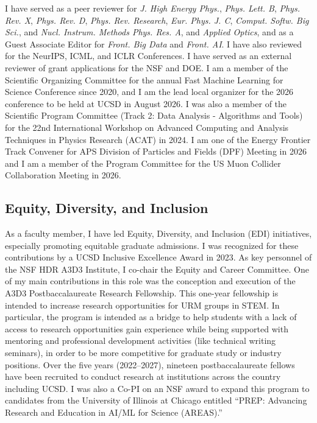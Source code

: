 \documentclass[11pt,letterpaper,notitlepage]{article}
\begin{document}
I have served as a peer reviewer for \emph{J. High Energy Phys.}, \emph{Phys. Lett. B}, \emph{Phys. Rev. X}, \emph{Phys. Rev. D}, \emph{Phys. Rev. Research}, \emph{Eur. Phys. J. C}, \emph{Comput. Softw. Big Sci.}, and \emph{Nucl. Instrum. Methods Phys. Res. A}, and \emph{Applied Optics}, and as a Guest Associate Editor for \emph{Front. Big Data} and \emph{Front. AI}.
I have also reviewed for the NeurIPS, ICML, and ICLR Conferences.
I have served as an external reviewer of grant applications for the NSF and DOE.
I am a member of the Scientific Organizing Committee for the annual Fast Machine Learning for Science Conference since 2020, and I am the lead local organizer for the 2026 conference to be held at UCSD in August 2026.
I was also a member of the Scientific Program Committee (Track 2: Data Analysis - Algorithms and Tools) for the 22nd International Workshop on Advanced Computing and Analysis Techniques in Physics Research (ACAT) in 2024.
I am one of the Energy Frontier Track Convener for APS Division of Particles and Fields (DPF) Meeting in 2026 and I am a member of the Program Committee for the US Muon Collider Collaboration Meeting in 2026.

\vspace{-1ex}
\subsection*{Equity, Diversity, and Inclusion}

As a faculty member, I have led Equity, Diversity, and Inclusion (EDI) initiatives, especially promoting equitable graduate admissions.
I was recognized for these contributions by a UCSD Inclusive Excellence Award in 2023.
As key personnel of the NSF HDR A3D3 Institute, I co-chair the Equity and Career Committee.
One of my main contributions in this role was the conception and execution of the A3D3 Postbaccalaureate Research Fellowship.
This one-year fellowship is intended to increase research opportunities for URM groups in STEM.
In particular, the program is intended as a bridge to help students with a lack of access to research opportunities gain experience while being supported with mentoring and professional development activities (like technical writing seminars), in order to be more competitive for graduate study or industry positions.
Over the five years (2022--2027), nineteen postbaccalaureate fellows have been recruited to conduct research at institutions across the country including UCSD.
I was also a Co-PI on an NSF award to expand this program to candidates from the University of Illinois at Chicago entitled ``PREP: Advancing Research and Education in AI/ML for Science (AREAS).''
\end{document}
